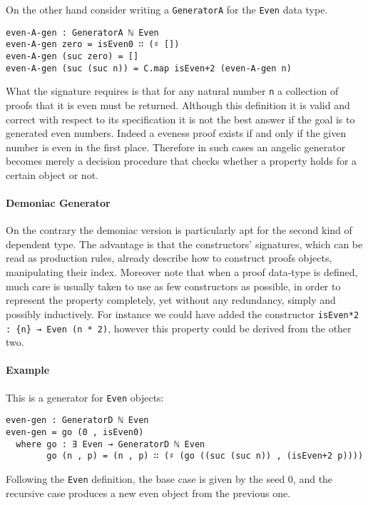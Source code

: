 \documentclass[10pt,a4paper]{article}
\begin{document}
On the other hand consider writing a \texttt{GeneratorA} for the \texttt{Even} data type.
\begin{verbatim}
even-A-gen : GeneratorA ℕ Even
even-A-gen zero = isEven0 ∷ (♯ [])
even-A-gen (suc zero) = []
even-A-gen (suc (suc n)) = C.map isEven+2 (even-A-gen n)
\end{verbatim}
What the signature requires is that for any natural number \texttt{n} a collection of proofs that it is even must be returned.
Although this definition it is valid and correct with respect to its specification
it is not the best answer if the goal is to generated even numbers.
Indeed a eveness proof exists if and only if the given number is even in the first place. Therefore in such cases an angelic generator becomes merely a decision procedure that checks whether a property holds for a certain object or not.

\paragraph{Demoniac Generator}
On the contrary the demoniac version is particularly apt for the second kind of dependent type. The advantage is that the constructors' signatures, which can be read as production rules, already describe how to construct proofs objects, manipulating their index.
Moreover note that when a proof data-type is defined, much care is usually taken to use as few constructors as possible, in order to represent the property completely, yet without any redundancy, simply and possibly inductively. For instance we could have added the constructor
 \texttt{isEven*2 :\ \{n\} → Even (n * 2)}, however this property could be derived from the other two.

\paragraph{Example}
This is a generator for \texttt{Even} objects:
\begin{verbatim}
even-gen : GeneratorD ℕ Even
even-gen = go (0 , isEven0)
  where go : ∃ Even → GeneratorD ℕ Even
        go (n , p) = (n , p) ∷ (♯ (go ((suc (suc n)) , (isEven+2 p))))
\end{verbatim}
Following the \texttt{Even} definition, the base case is given by the seed 0, and the recursive case produces a new even object from the previous one.
\end{document}
